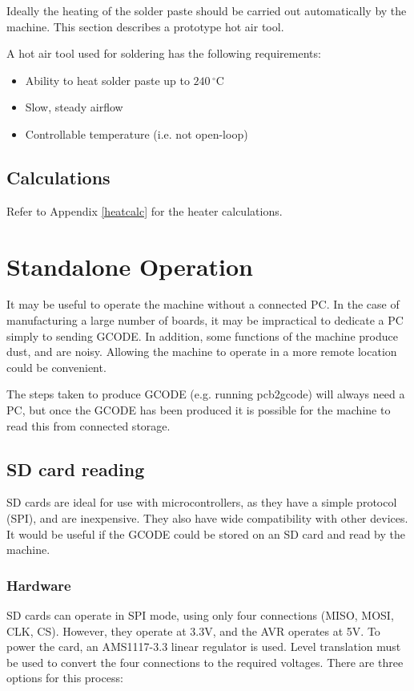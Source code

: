Ideally the heating of the solder paste should be carried out automatically by the machine. This section describes a prototype hot air tool.

A hot air tool used for soldering has the following requirements:

\begin{itemize} \itemsep0em
	\item	Ability to heat solder paste up to $240\,^{\circ}\mathrm{C}$
	\item	Slow, steady airflow
	\item	Controllable temperature (i.e. not open-loop)
\end{itemize}

\subsection{Calculations}

Refer to Appendix \ref{heatcalc} for the heater calculations.

\section{Standalone Operation}
It may be useful to operate the machine without a connected PC. In the case of manufacturing a large number of boards, it may be impractical to dedicate a PC simply to sending GCODE.
In addition, some functions of the machine produce dust, and are noisy. Allowing the machine to operate in a more remote location could be convenient. 

The steps taken to produce GCODE (e.g. running pcb2gcode) will always need a PC, but once the GCODE has been produced it is possible for the machine to read this from connected storage.

\subsection{SD card reading}
SD cards are ideal for use with microcontrollers, as they have a simple protocol (SPI), and are inexpensive. They also have wide compatibility with other devices. It would be useful if 
the GCODE could be stored on an SD card and read by the machine.

\subsubsection {Hardware}
SD cards can operate in SPI mode, using only four connections (MISO, MOSI, CLK, CS). However, they operate at 3.3V, and the AVR operates at 5V. To power the card, an AMS1117-3.3 linear regulator
is used. Level translation must be used to convert the four connections to the required voltages. There are three options for this process:


